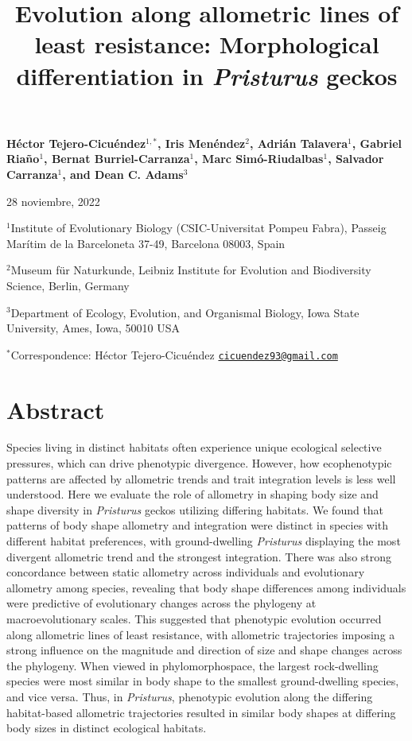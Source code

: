 \documentclass[
  11pt,
]{article}
\title{Evolution along allometric lines of least resistance: Morphological
differentiation in \emph{Pristurus} geckos}
\author{}
\date{\vspace{-2.5em}}
\begin{document}
\maketitle

\begin{center}
\textbf{H{\'{e}}ctor Tejero-Cicu{\'{e}}ndez$^{1,*}$,  Iris Men{\'{e}}ndez$^{2}$, Adri{\'{a}}n Talavera$^{1}$, Gabriel Riaño$^{1}$, Bernat Burriel-Carranza$^{1}$, Marc Sim{\'{o}}-Riudalbas$^{1}$, Salvador Carranza$^{1}$, and Dean C. Adams$^{3}$}
\end{center}

\begin{center}28 noviembre, 2022\end{center}

\(^{1}\)Institute of Evolutionary Biology (CSIC-Universitat Pompeu
Fabra), Passeig Marítim de la Barceloneta 37-49, Barcelona 08003, Spain

\(^{2}\)Museum für Naturkunde, Leibniz Institute for Evolution and
Biodiversity Science, Berlin, Germany

\(^{3}\)Department of Ecology, Evolution, and Organismal Biology, Iowa
State University, Ames, Iowa, 50010 USA

\(^{*}\)Correspondence: Héctor Tejero-Cicuéndez
\href{mailto:cicuendez93@gmail.com}{\nolinkurl{cicuendez93@gmail.com}}

\newpage

\hypertarget{abstract}{%
\section{Abstract}\label{abstract}}

Species living in distinct habitats often experience unique ecological
selective pressures, which can drive phenotypic divergence. However, how
ecophenotypic patterns are affected by allometric trends and trait
integration levels is less well understood. Here we evaluate the role of
allometry in shaping body size and shape diversity in \emph{Pristurus}
geckos utilizing differing habitats. We found that patterns of body
shape allometry and integration were distinct in species with different
habitat preferences, with ground-dwelling \emph{Pristurus} displaying
the most divergent allometric trend and the strongest integration. There
was also strong concordance between static allometry across individuals
and evolutionary allometry among species, revealing that body shape
differences among individuals were predictive of evolutionary changes
across the phylogeny at macroevolutionary scales. This suggested that
phenotypic evolution occurred along allometric lines of least
resistance, with allometric trajectories imposing a strong influence on
the magnitude and direction of size and shape changes across the
phylogeny. When viewed in phylomorphospace, the largest rock-dwelling
species were most similar in body shape to the smallest ground-dwelling
species, and vice versa. Thus, in \emph{Pristurus}, phenotypic evolution
along the differing habitat-based allometric trajectories resulted in
similar body shapes at differing body sizes in distinct ecological
habitats.
\end{document}
